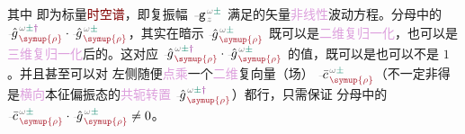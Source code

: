 其中  即为标量\textcolor{Maroon}{时空谱}，即\textcolor{PineGreen}{复振幅} $\Xint{\begin{smallmatrix} ~ \\ {}^{}_{\mathcolor{gray}{-}} \\ ~ \end{smallmatrix}}{09}{\mathtt{g}}^{\;\!\mathcolor{gray}{\omega} \textcolor{PineGreen}{\pm}}_{\;\! \mathcolor{gray}{z}}$ 满足的矢量\textcolor{Plum}{非线性}波动方程。分母中的 $\Xint{{}^{}_{\mathcolor{gray}{-}}}{10}{\hat{g}}^{\;\!\mathcolor{gray}{\omega} \textcolor{PineGreen}{\pm} \textcolor{Plum}{\dag}}_{\;\! \textcolor{Maroon}{\symup{\rho}}} \cdot \Xint{{}^{}_{\mathcolor{gray}{-}}}{10}{\hat{g}}^{\;\!\mathcolor{gray}{\omega} \textcolor{PineGreen}{\pm}}_{\;\! \textcolor{Maroon}{\symup{\rho}}}$，其实在暗示 $\Xint{{}^{}_{\mathcolor{gray}{-}}}{10}{\hat{g}}^{\;\!\mathcolor{gray}{\omega} \textcolor{PineGreen}{\pm}}_{\;\! \textcolor{Maroon}{\symup{\rho}}}$ 既可以是\textcolor{Plum}{二维复归一化}，也可以是\textcolor{Plum}{三维复归一化}后的。这对应 $\Xint{{}^{}_{\mathcolor{gray}{-}}}{10}{\hat{g}}^{\;\!\mathcolor{gray}{\omega} \textcolor{PineGreen}{\pm} \textcolor{Plum}{\dag}}_{\;\! \textcolor{Maroon}{\symup{\rho}}} \cdot \Xint{{}^{}_{\mathcolor{gray}{-}}}{10}{\hat{g}}^{\;\!\mathcolor{gray}{\omega} \textcolor{PineGreen}{\pm}}_{\;\! \textcolor{Maroon}{\symup{\rho}}}$ 的值，既可以是也可以不是 $1$。并且甚至可以对  左侧随便\textcolor{Plum}{点乘}一个\textcolor{Plum}{二维}复向量（场） $\Xint{{}^{}_{\mathcolor{gray}{-}}}{04}{\bar{c}}^{\;\!\mathcolor{gray}{\omega} \textcolor{PineGreen}{\pm}}_{\;\! \textcolor{Maroon}{\symup{\rho}}}$（不一定非得是\textcolor{Plum}{横向}\textcolor{PineGreen}{本征偏振态}的\textcolor{Plum}{共轭转置} $\Xint{{}^{}_{\mathcolor{gray}{-}}}{10}{\hat{g}}^{\;\!\mathcolor{gray}{\omega} \textcolor{PineGreen}{\pm} \textcolor{Plum}{\dag}}_{\;\! \textcolor{Maroon}{\symup{\rho}}}$）都行，只需保证  分母中的 $\Xint{{}^{}_{\mathcolor{gray}{-}}}{04}{\bar{c}}^{\;\!\mathcolor{gray}{\omega} \textcolor{PineGreen}{\pm}}_{\;\! \textcolor{Maroon}{\symup{\rho}}} \cdot \Xint{{}^{}_{\mathcolor{gray}{-}}}{10}{\hat{g}}^{\;\!\mathcolor{gray}{\omega} \textcolor{PineGreen}{\pm}}_{\;\! \textcolor{Maroon}{\symup{\rho}}} \neq 0$。

